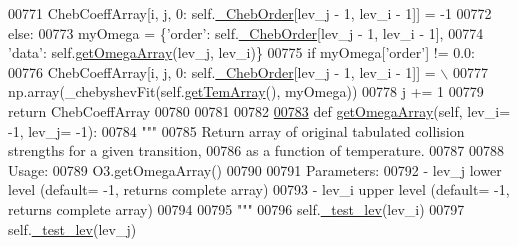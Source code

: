 \begin{DoxyCode}
{{00771                         ChebCoeffArray[i, j, 0: self.\hyperlink{classpyneb_1_1core_1_1pynebcore_1_1___coll_data_fits_aeb6a6f312ca21c1e1b3aa72225a0d442}{\_ChebOrder}[lev\_j - 1, lev\_i - 1]] = -1
00772                     \textcolor{keywordflow}{else}:
00773                         myOmega = \{\textcolor{stringliteral}{'order'}: self.\hyperlink{classpyneb_1_1core_1_1pynebcore_1_1___coll_data_fits_aeb6a6f312ca21c1e1b3aa72225a0d442}{\_ChebOrder}[lev\_j - 1, lev\_i - 1],
00774                                    \textcolor{stringliteral}{'data'}: self.\hyperlink{classpyneb_1_1core_1_1pynebcore_1_1___coll_data_fits_acca4425c4b7d2e08d0b1b9fe6e1846a7}{getOmegaArray}(lev\_j, lev\_i)\}
00775                         \textcolor{keywordflow}{if} myOmega[\textcolor{stringliteral}{'order'}] != 0.0:
00776                             ChebCoeffArray[i, j, 0: self.\hyperlink{classpyneb_1_1core_1_1pynebcore_1_1___coll_data_fits_aeb6a6f312ca21c1e1b3aa72225a0d442}{\_ChebOrder}[lev\_j - 1, lev\_i - 1]] = \(\backslash\)
00777                                 np.array(\_chebyshevFit(self.\hyperlink{classpyneb_1_1core_1_1pynebcore_1_1___coll_data_fits_a6b53fa73abb34d16f1066dc52604f25c}{getTemArray}(), myOmega))
00778                     j += 1
00779             \textcolor{keywordflow}{return} ChebCoeffArray
00780 
00781 
00782 
\hypertarget{pynebcore_8py_source_l00783}{}\hyperlink{classpyneb_1_1core_1_1pynebcore_1_1___coll_data_fits_acca4425c4b7d2e08d0b1b9fe6e1846a7}{00783}     \textcolor{keyword}{def }\hyperlink{classpyneb_1_1core_1_1pynebcore_1_1___coll_data_fits_acca4425c4b7d2e08d0b1b9fe6e1846a7}{getOmegaArray}(self, lev\_i= -1, lev\_j= -1):
00784         \textcolor{stringliteral}{"""}
00785 \textcolor{stringliteral}{        Return array of original tabulated collision strengths for a given transition, }
00786 \textcolor{stringliteral}{            as a function of temperature.}
00787 \textcolor{stringliteral}{        }
00788 \textcolor{stringliteral}{        Usage:}
00789 \textcolor{stringliteral}{            O3.getOmegaArray()}
00790 \textcolor{stringliteral}{        }
00791 \textcolor{stringliteral}{        Parameters:}
00792 \textcolor{stringliteral}{            - lev\_j  lower level (default= -1, returns complete array)}
00793 \textcolor{stringliteral}{            - lev\_i  upper level (default= -1, returns complete array)}
00794 \textcolor{stringliteral}{}
00795 \textcolor{stringliteral}{        """}
00796         self.\hyperlink{classpyneb_1_1core_1_1pynebcore_1_1___coll_data_fits_a7bc932cc0743068d924a2ac51af0b4d4}{\_test\_lev}(lev\_i)
00797         self.\hyperlink{classpyneb_1_1core_1_1pynebcore_1_1___coll_data_fits_a7bc932cc0743068d924a2ac51af0b4d4}{\_test\_lev}(lev\_j)
}}
\end{DoxyCode}
